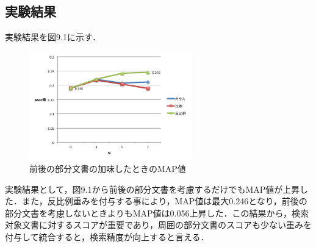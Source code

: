 \subsection{実験結果}
実験結果を図9.1に示す．

\begin{figure}
    \centering
    \includegraphics[width=7cm]{./image/zengo.png}
    \caption{前後の部分文書の加味したときのMAP値}
    \label{web_result1}
\end{figure}

実験結果として，図9.1から前後の部分文書を考慮するだけでもMAP値が上昇した．また，反比例重みを付与する事により，MAP値は最大0.246となり，前後の部分文書を考慮しないときよりもMAP値は0.056上昇した．この結果から，検索対象文書に対するスコアが重要であり，周囲の部分文書のスコアも少ない重みを付与して統合すると，検索精度が向上すると言える．